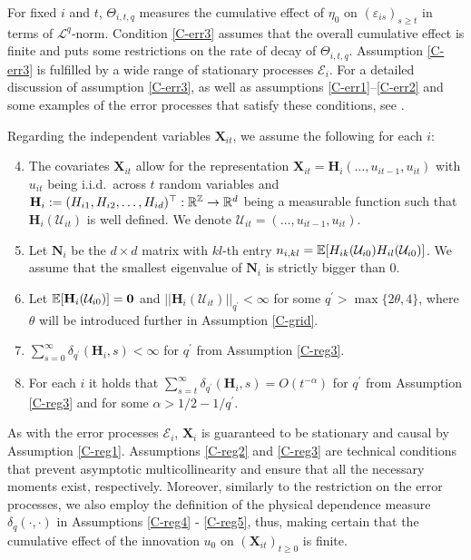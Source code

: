 \documentclass[a4paper,12pt]{article}
\begin{document}
For fixed $i$ and $t$, $\Theta_{i, t,q}$ measures the cumulative effect of $\eta_0$ on $(\varepsilon_{is})_{s\geq t}$ in terms of $\mathcal{L}^q$-norm. Condition \ref{C-err3} assumes that the overall cumulative effect is finite and puts some restrictions on the rate of decay of $\Theta_{i, t,q}$. Assumption \ref{C-err3} is fulfilled by a wide range of stationary processes $\mathcal{E}_i$. For a detailed discussion of assumption \ref{C-err3}, as well as assumptions \ref{C-err1}--\ref{C-err2} and some examples of the error processes that satisfy these conditions, see \cite{KhismatullinaVogt2020}.

Regarding the independent variables $ \mathbf{X}_{it}$, we assume the following for each $i$:

\begin{enumerate}[label=(C\arabic*),leftmargin=1.05cm]
\setcounter{enumi}{3}

\item \label{C-reg1} The covariates $ \mathbf{X}_{it}$ allow for the representation $ \mathbf{X}_{it} = \mathbf{H}_i(\ldots,u_{it-1},u_{it})$ with $u_{it}$ being i.i.d.\  across $t$ random variables and $\mathbf{H}_i := (H_{i1}, H_{i2}, \ldots, H_{id})^\top: \mathbb{R}^{\mathbb{Z}} \rightarrow \mathbb{R}^d$ being a measurable function such that $\mathbf{H}_i(\mathcal{U}_{it})$ is well defined. We denote $\mathcal{U}_{it} = (\ldots, u_{it-1}, u_{it})$.

\item \label{C-reg2} Let $\mathbf{N}_i$ be the $d\times d$ matrix with $kl$-th entry $n_{i, kl}= \mathbb{E}[H_{ik}(\mathcal{U}_{i0})H_{il}(\mathcal{U}_{i0})]$. We assume that the smallest eigenvalue of $\mathbf{N}_i$ is strictly bigger than $0$.

\item \label{C-reg3} Let $\mathbb{E} [\mathbf{H}_{i}(\mathcal{U}_{i0})]=\mathbf{0}$ and $||\mathbf{H}_{i}(\mathcal{U}_{it})||_{q^\prime} <\infty$ for some $q^\prime > \max\{ 2\theta, 4\}$, where $\theta$ will be introduced further in Assumption \ref{C-grid}.
\item \label{C-reg4} $\sum_{s=0}^\infty \delta_{q^\prime}(\mathbf{H}_i, s)<\infty$ for $q^\prime$ from Assumption \ref{C-reg3}.
\item \label{C-reg5} For each $i$ it holds that $\sum_{s=t}^{\infty} \delta_{q^\prime}(\mathbf{H}_{i}, s)= O(t^{-\alpha}) $ for $q^\prime$ from Assumption \ref{C-reg3} and for some $\alpha > 1/2 - 1/{q^\prime}$.
\end{enumerate}

As with the error processes $\mathcal{E}_i$, $\mathbf{X}_i$ is guaranteed to be stationary and causal by Assumption \ref{C-reg1}. Assumptions \ref{C-reg2} and \ref{C-reg3} are technical conditions that prevent asymptotic multicollinearity and ensure that all the necessary moments exist, respectively. Moreover, similarly to the restriction on the error processes, we also employ the definition of the physical dependence measure $ \delta_{q}(\cdot, \cdot)$ in Assumptions \ref{C-reg4} - \ref{C-reg5}, thus, making certain that the cumulative effect of the innovation $u_0$ on $(\mathbf{X}_{it})_{t\geq 0}$ is finite. 
\end{document}
